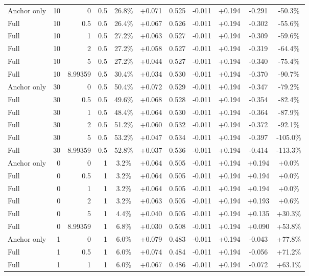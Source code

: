 \begin{table}[htbp]
\begin{tabular}{lrrrccccccc}
Anchor only & 10 & 0 & 0.5 & 26.8\% & +0.071 & 0.525 & -0.011 & +0.194 & -0.291 & -50.3\% \\
Full & 10 & 0.5 & 0.5 & 26.4\% & +0.067 & 0.526 & -0.011 & +0.194 & -0.302 & -55.6\% \\
Full & 10 & 1 & 0.5 & 27.2\% & +0.063 & 0.527 & -0.011 & +0.194 & -0.309 & -59.6\% \\
Full & 10 & 2 & 0.5 & 27.2\% & +0.058 & 0.527 & -0.011 & +0.194 & -0.319 & -64.4\% \\
Full & 10 & 5 & 0.5 & 27.2\% & +0.044 & 0.527 & -0.011 & +0.194 & -0.340 & -75.4\% \\
Full & 10 & 8.99359 & 0.5 & 30.4\% & +0.034 & 0.530 & -0.011 & +0.194 & -0.370 & -90.7\% \\
Anchor only & 30 & 0 & 0.5 & 50.4\% & +0.072 & 0.529 & -0.011 & +0.194 & -0.347 & -79.2\% \\
Full & 30 & 0.5 & 0.5 & 49.6\% & +0.068 & 0.528 & -0.011 & +0.194 & -0.354 & -82.4\% \\
Full & 30 & 1 & 0.5 & 48.4\% & +0.064 & 0.530 & -0.011 & +0.194 & -0.364 & -87.9\% \\
Full & 30 & 2 & 0.5 & 51.2\% & +0.060 & 0.532 & -0.011 & +0.194 & -0.372 & -92.1\% \\
Full & 30 & 5 & 0.5 & 53.2\% & +0.047 & 0.534 & -0.011 & +0.194 & -0.397 & -105.0\% \\
Full & 30 & 8.99359 & 0.5 & 52.8\% & +0.037 & 0.536 & -0.011 & +0.194 & -0.414 & -113.3\% \\
Anchor only & 0 & 0 & 1 & 3.2\% & +0.064 & 0.505 & -0.011 & +0.194 & +0.194 & +0.0\% \\
Full & 0 & 0.5 & 1 & 3.2\% & +0.064 & 0.505 & -0.011 & +0.194 & +0.194 & +0.0\% \\
Full & 0 & 1 & 1 & 3.2\% & +0.064 & 0.505 & -0.011 & +0.194 & +0.194 & +0.0\% \\
Full & 0 & 2 & 1 & 3.2\% & +0.063 & 0.505 & -0.011 & +0.194 & +0.193 & +0.6\% \\
Full & 0 & 5 & 1 & 4.4\% & +0.040 & 0.505 & -0.011 & +0.194 & +0.135 & +30.3\% \\
Full & 0 & 8.99359 & 1 & 6.8\% & +0.030 & 0.508 & -0.011 & +0.194 & +0.090 & +53.8\% \\
Anchor only & 1 & 0 & 1 & 6.0\% & +0.079 & 0.483 & -0.011 & +0.194 & -0.043 & +77.8\% \\
Full & 1 & 0.5 & 1 & 6.0\% & +0.074 & 0.484 & -0.011 & +0.194 & -0.056 & +71.2\% \\
Full & 1 & 1 & 1 & 6.0\% & +0.067 & 0.486 & -0.011 & +0.194 & -0.072 & +63.1\% \\

\end{tabular}
\end{table}
